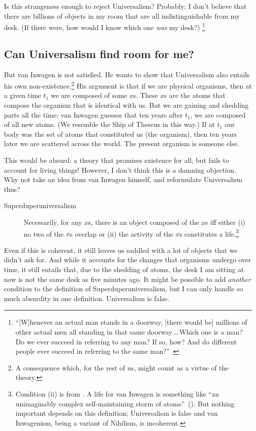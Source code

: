 \documentclass[11pt]{article}
\begin{document}
\begin{spacing}{1.5}
Is this strangeness enough to reject Universalism? Probably; I don't believe that there are billions of objects in my room that are all indistinguishable from my desk. (If there were, how would I know which one {\em was} my desk?)%
\footnote{``[W]henever an actual man stands in a doorway, [there would be] millions of other actual men all standing in that same doorway\,\ldots\,Which one is a man? Do we ever succeed in referring to any man? If so, how? And do different people ever succeed in referring to the same man?''~\citep[241--242]{markosian1998a}}

\subsection{Can Universalism find room for me?}
But van Inwagen is not satisfied. He wants to show that Universalism also entails his own non-existence.\footnote{A consequence which, for the rest of us, might count as a virtue of the theory.} His argument is that if we are physical organisms, then at a given time $t_{1}$ we are composed of some $x$s. These $x$s are the atoms that compose the organism that is identical with us. But we are gaining and shedding parts all the time; van Inwagen guesses that ten years after $t_{1}$, we are composed of all new atoms. (We resemble the Ship of Theseus in this way.) If at $t_{1}$ our body was the set of atoms that constituted us (the organism), then ten years later we are scattered across the world. The present organism is someone else.

This would be absurd: a theory that promises existence for all, but fails to account for living things! However, I don't think this is a damning objection. Why not take an idea from van Inwagen himself, and reformulate Universalism thus?
\begin{description}
	\item[Superduperuniversalism] Necessarily, for any $x$s, there is an object composed of the $x$s iff either (i) no two of the $x$s overlap or (ii) the activity of the $x$s constitutes a life.\footnote{Condition (ii) is from \citet[82]{inwagen1995}. A life for van Inwagen is something like ``an unimaginably complex self-maintaining storm of atoms''~(\citeyear[87]{inwagen1995}). But nothing important depends on this definition; Universalism is false and van Inwagenism, being a variant of Nihilism, is incoherent.}
\end{description}
Even if this is coherent, it still leaves us saddled with a lot of objects that we didn't ask for. And while it accounts for the changes that organisms undergo over time, it still entails that, due to the shedding of atoms, the desk I am sitting at now is not the same desk as five minutes ago. It might be possible to add {\em another} condition to the definition of Superduperuniversalism, but I can only handle so much absurdity in one definition. Universalism is false.


\end{spacing}
\end{document}
